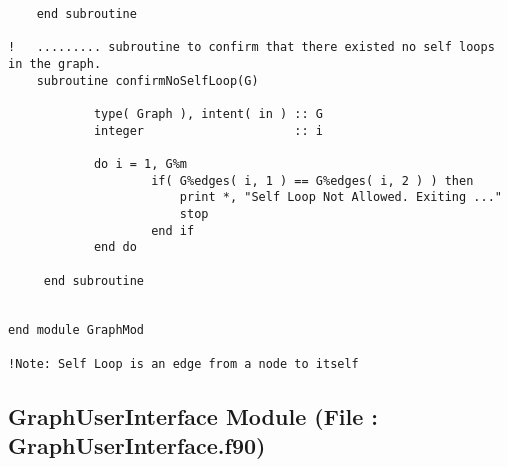 \documentclass[10pt,a4paper,margin = 1.25cm]{article}
\begin{document}
\begin{lstlisting}
  	end subroutine
    
!   ......... subroutine to confirm that there existed no self loops in the graph.
  	subroutine confirmNoSelfLoop(G)
  
  			type( Graph ), intent( in ) :: G
  			integer                     :: i
  
  			do i = 1, G%m
				    if( G%edges( i, 1 ) == G%edges( i, 2 ) ) then
      					print *, "Self Loop Not Allowed. Exiting ..."
      					stop
    				end if
  			end do
  
 	 end subroutine
 	 
 	 
end module GraphMod

!Note: Self Loop is an edge from a node to itself
\end{lstlisting}

\subsection*{GraphUserInterface Module (File : GraphUserInterface.f90) }
\end{document}
